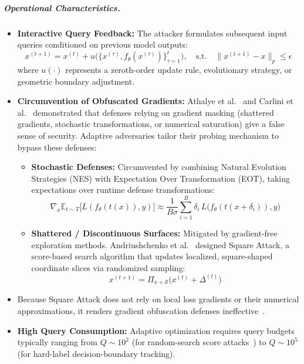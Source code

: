 \documentclass[12pt]{article}
\begin{document}
\subparagraph{Operational Characteristics.}
\begin{itemize}
  \item \textbf{Interactive Query Feedback:} The attacker formulates subsequent input queries conditioned on previous model outputs:
  \begin{equation}
    x^{(t+1)} = x^{(t)} + u\Big(\big\{x^{(\tau)}, f_\theta(x^{(\tau)})\big\}_{\tau=1}^{t}\Big), \quad \text{s.t.} \quad \lVert x^{(t+1)} - x \rVert_p \le \epsilon
  \end{equation}
  where $u(\cdot)$ represents a zeroth-order update rule, evolutionary strategy, or geometric boundary adjustment.
  \item \textbf{Circumvention of Obfuscated Gradients:} Athalye et al.~\cite{athalye2018} and Carlini et al.~\cite{carlini2019} demonstrated that defenses relying on gradient masking (shattered gradients, stochastic transformations, or numerical saturation) give a false sense of security. Adaptive adversaries tailor their probing mechanism to bypass these defenses:
  \begin{itemize}
    \item \textbf{Stochastic Defenses:} Circumvented by combining Natural Evolution Strategies (NES) with Expectation Over Transformation (EOT), taking expectations over runtime defense transformations:
    \begin{equation}
      \nabla_x \mathbb{E}_{t \sim T}\big[L(f_\theta(t(x)), y)\big] \approx \frac{1}{B\sigma} \sum_{i=1}^{B} \delta_i\, L\big(f_\theta(t(x+\delta_i)), y\big)
    \end{equation}
    \item \textbf{Shattered / Discontinuous Surfaces:} Mitigated by gradient-free exploration methods. Andriushchenko et al.~\cite{andriushchenko2020} designed Square Attack, a score-based search algorithm that updates localized, square-shaped coordinate slices via randomized sampling:
    \begin{equation}
      x^{(t+1)} = \Pi_{x+\mathcal{S}}\big(x^{(t)} + \Delta^{(t)}\big)
    \end{equation}
  \end{itemize}
  \item[] Because Square Attack does not rely on local loss gradients or their numerical approximations, it renders gradient obfuscation defenses ineffective~\cite{carlini2019,andriushchenko2020}.
  \item \textbf{High Query Consumption:} Adaptive optimization requires query budgets typically ranging from $Q \sim 10^2$ (for random-search score attacks~\cite{andriushchenko2020}) to $Q \sim 10^5$ (for hard-label decision-boundary tracking).
\end{itemize}
\end{document}
